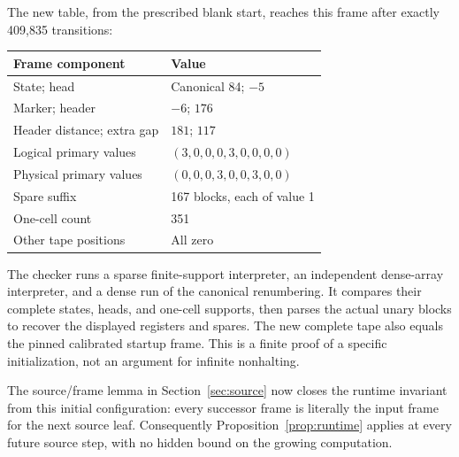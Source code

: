 The new table, from the prescribed blank start, reaches this frame
after exactly 409,835 transitions:
\begin{center}
\begin{tabular}{@{}L{0.38\textwidth}L{0.51\textwidth}@{}}
\toprule
Frame component & Value\\
\midrule
State; head & Canonical 84; $-5$\\
Marker; header & $-6$; $176$\\
Header distance; extra gap & $181$; $117$\\
Logical primary values & $(3,0,0,0,3,0,0,0,0)$\\
Physical primary values & $(0,0,0,3,0,0,3,0,0)$\\
Spare suffix & 167 blocks, each of value 1\\
One-cell count & 351\\
Other tape positions & All zero\\
\bottomrule
\end{tabular}
\end{center}

The checker runs a sparse finite-support interpreter, an independent
dense-array interpreter, and a dense run of the canonical renumbering.
It compares their complete states, heads, and one-cell supports,
then parses the actual unary blocks to recover the displayed
registers and spares. The new complete tape also equals the pinned
calibrated startup frame. This is a finite proof of a specific
initialization, not an argument for infinite nonhalting.

The source/frame lemma in Section~\ref{sec:source} now closes the
runtime invariant from this initial configuration: every successor
frame is literally the input frame for the next source leaf.
Consequently Proposition~\ref{prop:runtime} applies at every future
source step, with no hidden bound on the growing computation.
